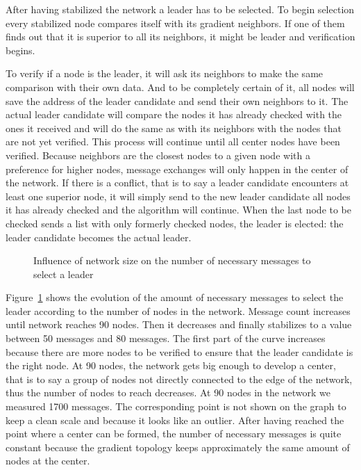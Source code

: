 \documentclass[conference]{IEEEtran}
\begin{document}
After having stabilized the network a leader has to be selected. To begin selection every stabilized node compares itself with its gradient neighbors. If one of them finds out that it is superior to all its neighbors, it might be leader and verification begins. 

To verify if a node is the leader, it will ask its neighbors to make the same comparison with their own data. And to be completely certain of it, all nodes will save the address of the leader candidate and send their own neighbors to it. The actual leader candidate will compare the nodes it has already checked with the ones it received and will do the same as with its neighbors with the nodes that are not yet verified. %
This process will continue until all center nodes have been verified. Because neighbors are the closest nodes to a given node with a preference for higher nodes, message exchanges will only happen in the center of the network. If there is a conflict, that is to say a leader candidate encounters at least one superior node, it will simply send to the new leader candidate all nodes it has already checked and the algorithm will continue. When the last node to be checked sends a list with only formerly checked nodes, the leader is elected: the leader candidate becomes the actual leader.


\begin{figure}
\caption{Influence of network size on the number of necessary messages to select a leader}
\label{fig:T2_Election}
\end{figure}

Figure~\ref{fig:T2_Election} shows the evolution of the amount of necessary messages to select the leader according to the number of nodes in the network. Message count increases until network reaches 90 nodes. Then it decreases and finally stabilizes to a value between 50 messages and 80 messages. The first part of the curve increases because there are more nodes to be verified to ensure that the leader candidate is the right node. At 90 nodes, the network gets big enough to develop a center, that is to say a group of nodes not directly connected to the edge of the network, thus the number of nodes to reach decreases. At 90 nodes in the network we measured 1700 messages. The corresponding point is not shown on the graph to keep a clean scale and because it looks like an outlier. After having reached the point where a center can be formed, the number of necessary messages is quite constant because the gradient topology keeps approximately the same amount of nodes at the center.
\end{document}
